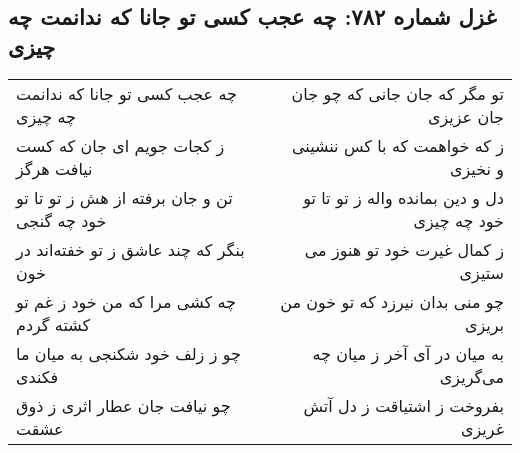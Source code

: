 \begin{center}
\section*{غزل شماره ۷۸۲: چه عجب کسی تو جانا که ندانمت چه چیزی}
\label{sec:782}
\begin{longtable}{l p{0.5cm} r}
چه عجب کسی تو جانا که ندانمت چه چیزی
&&
تو مگر که جان جانی که چو جان جان عزیزی
\\
ز کجات جویم ای جان که کست نیافت هرگز
&&
ز که خواهمت که با کس ننشینی و نخیزی
\\
تن و جان برفته از هش ز تو تا تو خود چه گنجی
&&
دل و دین بمانده واله ز تو تا تو خود چه چیزی
\\
بنگر که چند عاشق ز تو خفته‌اند در خون
&&
ز کمال غیرت خود تو هنوز می ستیزی
\\
چه کشی مرا که من خود ز غم تو کشته گردم
&&
چو منی بدان نیرزد که تو خون من بریزی
\\
چو ز زلف خود شکنجی به میان ما فکندی
&&
به میان در آی آخر ز میان چه می‌گریزی
\\
چو نیافت جان عطار اثری ز ذوق عشقت
&&
بفروخت ز اشتیاقت ز دل آتش غریزی
\\
\end{longtable}
\end{center}
